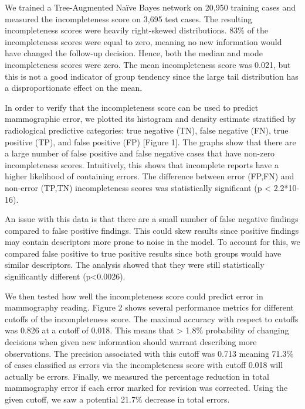 We trained a Tree-Augmented Naïve Bayes network on 20,950 training cases and measured the incompleteness score on 3,695 test cases. The resulting incompleteness scores were heavily right-skewed distributions. 83\% of the incompleteness scores were equal to zero, meaning no new information would have changed the follow-up decision. Hence, both the median and mode incompleteness scores were zero. The mean incompleteness score was 0.021, but this is not a good indicator of group tendency since the large tail distribution has a disproportionate effect on the mean. 

In order to verify that the incompleteness score can be used to predict mammographic error, we plotted its histogram and density estimate stratified by radiological predictive categories: true negative (TN), false negative (FN), true positive (TP), and false positive (FP) [Figure 1]. The graphs show that there are a large number of false positive and false negative cases that have non-zero incompleteness scores. Intuitively, this shows that incomplete reports have a higher likelihood of containing errors. The difference between error (FP,FN) and non-error (TP,TN) incompleteness scores was statistically significant (p < 2.2*10-16). 

An issue with this data is that there are a small number of false negative findings compared to false positive findings. This could skew results since positive findings may contain descriptors more prone to noise in the model. To account for this, we compared false positive to true positive results since both groups would have similar descriptors. The analysis showed that they were still statistically significantly different (p<0.0026).

We then tested how well the incompleteness score could predict error in mammography reading. Figure 2 shows several performance metrics for different cutoffs of the incompleteness score. The maximal accuracy with respect to cutoffs was 0.826 at a cutoff of 0.018. This means that > 1.8\% probability of changing decisions when given new information should warrant describing more observations. The precision associated with this cutoff was 0.713 meaning 71.3\% of cases classified as errors via the incompleteness score with cutoff 0.018 will actually be errors. Finally, we measured the percentage reduction in total mammography error if each error marked for revision was corrected. Using the given cutoff, we saw a potential 21.7\% decrease in total errors.
